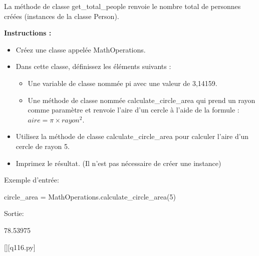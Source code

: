     La méthode de classe get\_total\_people renvoie le nombre total de personnes créées (instances de la classe Person).

		\textbf{Instructions :}

		\begin{itemize}
		\item Créez une classe appelée MathOperations.
		\item Dans cette classe, définissez les éléments suivants :
			\begin{itemize}
			\item Une variable de classe nommée pi avec une valeur de 3,14159.
			\item Une méthode de classe nommée calculate\_circle\_area qui prend un rayon comme paramètre et renvoie l'aire d'un cercle à l'aide de la formule : $aire = \pi × rayon^2$.
			\end{itemize}
		\item Utilisez la méthode de classe calculate\_circle\_area pour calculer l'aire d'un cercle de rayon 5.
		\item Imprimez le résultat. (Il n'est pas nécessaire de créer une instance)
		\end{itemize}
		
		Exemple d'entrée:
		
		circle\_area = MathOperations.calculate\_circle\_area(5)
		
		Sortie:
		
		78.53975
		\par
		\renewcommand{\nomfichier}{q116.py}
		\begin{solution}
		    \pythonfile{\chemincode \nomfichier}[][\nomfichier]
		\end{solution}
        
